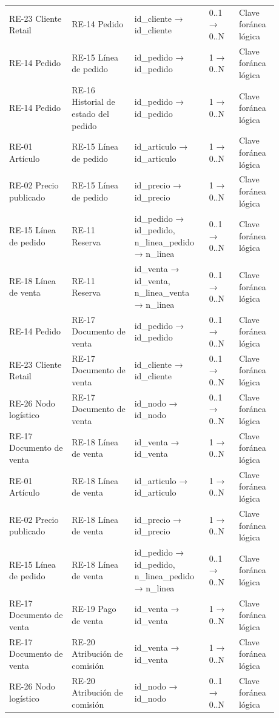 \documentclass[11pt]{article}
\begin{document}
\begin{longtable}{@{}p{0.215\linewidth}p{0.215\linewidth}p{0.224\linewidth}p{0.103\linewidth}p{0.120\linewidth}@{}}
RE-23 Cliente Retail & RE-14 Pedido & id\_cliente → id\_cliente & 0..1 → 0..N & Clave foránea lógica \\
RE-14 Pedido & RE-15 Línea de pedido & id\_pedido → id\_pedido & 1 → 0..N & Clave foránea lógica \\
RE-14 Pedido & RE-16 Historial de estado del pedido & id\_pedido → id\_pedido & 1 → 0..N & Clave foránea lógica \\
RE-01 Artículo & RE-15 Línea de pedido & id\_articulo → id\_articulo & 1 → 0..N & Clave foránea lógica \\
RE-02 Precio publicado & RE-15 Línea de pedido & id\_precio → id\_precio & 1 → 0..N & Clave foránea lógica \\
RE-15 Línea de pedido & RE-11 Reserva & id\_pedido → id\_pedido, n\_linea\_pedido → n\_linea & 0..1 → 0..N & Clave foránea lógica \\
RE-18 Línea de venta & RE-11 Reserva & id\_venta → id\_venta, n\_linea\_venta → n\_linea & 0..1 → 0..N & Clave foránea lógica \\
RE-14 Pedido & RE-17 Documento de venta & id\_pedido → id\_pedido & 0..1 → 0..N & Clave foránea lógica \\
RE-23 Cliente Retail & RE-17 Documento de venta & id\_cliente → id\_cliente & 0..1 → 0..N & Clave foránea lógica \\
RE-26 Nodo logístico & RE-17 Documento de venta & id\_nodo → id\_nodo & 0..1 → 0..N & Clave foránea lógica \\
RE-17 Documento de venta & RE-18 Línea de venta & id\_venta → id\_venta & 1 → 0..N & Clave foránea lógica \\
RE-01 Artículo & RE-18 Línea de venta & id\_articulo → id\_articulo & 1 → 0..N & Clave foránea lógica \\
RE-02 Precio publicado & RE-18 Línea de venta & id\_precio → id\_precio & 1 → 0..N & Clave foránea lógica \\
RE-15 Línea de pedido & RE-18 Línea de venta & id\_pedido → id\_pedido, n\_linea\_pedido → n\_linea & 0..1 → 0..N & Clave foránea lógica \\
RE-17 Documento de venta & RE-19 Pago de venta & id\_venta → id\_venta & 1 → 0..N & Clave foránea lógica \\
RE-17 Documento de venta & RE-20 Atribución de comisión & id\_venta → id\_venta & 1 → 0..N & Clave foránea lógica \\
RE-26 Nodo logístico & RE-20 Atribución de comisión & id\_nodo → id\_nodo & 0..1 → 0..N & Clave foránea lógica \\

\end{longtable}
\end{document}

